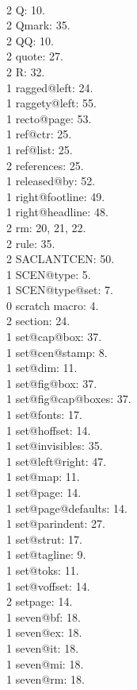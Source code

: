 \\2 Q: 10.
\\2 Qmark: 35.
\\2 QQ: 10.
\\2 quote: 27.
\\2 R: 32.
\\1 ragged@left: 24.
\\1 raggety@left: 55.
\\1 recto@page: 53.
\\1 ref@ctr: 25.
\\1 ref@list: 25.
\\2 references: 25.
\\1 released@by: 52.
\\1 right@footline: 49.
\\1 right@headline: 48.
\\2 rm: 20, 21, 22.
\\2 rule: 35.
\\2 SACLANTCEN: 50.
\\1 SCEN@type: 5.
\\1 SCEN@type@set: 7.
\\0 scratch macro: 4.
\\2 section: 24.
\\1 set@cap@box: 37.
\\1 set@cen@stamp: 8.
\\1 set@dim: 11.
\\1 set@fig@box: 37.
\\1 set@fig@cap@boxes: 37.
\\1 set@fonts: 17.
\\1 set@hoffset: 14.
\\1 set@invisibles: 35.
\\1 set@left@right: 47.
\\1 set@map: 11.
\\1 set@page: 14.
\\1 set@page@defaults: 14.
\\1 set@parindent: 27.
\\1 set@strut: 17.
\\1 set@tagline: 9.
\\1 set@toks: 11.
\\1 set@voffset: 14.
\\2 setpage: 14.
\\1 seven@bf: 18.
\\1 seven@ex: 18.
\\1 seven@it: 18.
\\1 seven@mi: 18.
\\1 seven@rm: 18.
